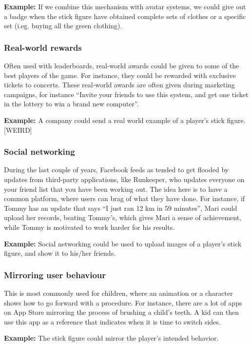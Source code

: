 \textbf{Example:} If we combine this mechanism with avatar systems, we could give out a badge when the stick figure have obtained complete sets of clothes or a specific set (i.eg. buying all the green clothing).   

\subsubsection{Real-world rewards}
Often used with leaderboards, real-world awards could be given to some of the best players of the game. For instance, they could be rewarded with exclusive tickets to concerts. These real-world awards are often given during marketing campaigns, for instance ``Invite your friends to use this system, and get one ticket in the lottery to win a brand new computer''.  

\textbf{Example:} A company could send a real world example of a player's stick figure. [WEIRD]

\subsubsection{Social networking}
During the last couple of years, Facebook feeds as tended to get flooded by updates from third-party applications, like Runkeeper, who updates everyone on your friend list that you have been working out. The idea here is to have a common platform, where users can brag of what they have done. For instance, if Tommy has an update that says ``I just ran 12 km in 59 minutes'', Mari could upload her records, beating Tommy's, which gives Mari a sense of achievement, while Tommy is motivated to work harder for his results.     

\textbf{Example:} Social networking could be used to upload images of a player's stick figure, and show it to his/her friends. 

\subsubsection{Mirroring user behaviour}
This is most commonly used for children, where an animation or a character shows how to go forward with a procedure. For instance, there are a lot of apps on App Store mirroring the process of brushing a child's teeth. A kid can then use this app as a reference that indicates when it is time to switch sides.  

\textbf{Example:} The stick figure could mirror the player's intended behavior. 

